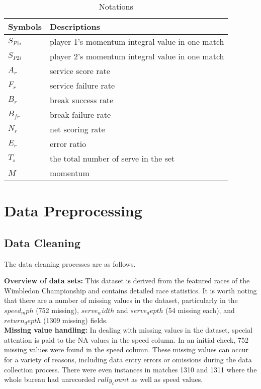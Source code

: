 \documentclass{mcmthesis}
\begin{document}
\begin{table}[h] 
\centering  
\caption{Notations}  
\label{tab1} 
\begin{tabular}{ll} 
\toprule
Symbols  & Descriptions \\    
\midrule 
$S_{P1i}$ & player 1’s momentum integral value in one match\\
$S_{P2i}$ & player 2’s momentum integral value in one match\\
$A_r$   & service score rate                             \\
$F_r$   & service failure rate                           \\
$B_r$   & break success rate                             \\
$B_{fr}$  & break failure rate                             \\
\midrule 
$N_r$   & net scoring rate                               \\
\midrule 
$E_r$   & error ratio                                    \\
\midrule 
$T_s$   & the total number of serve in the set           \\
\midrule 
$M$     & momentum                                       \\

\bottomrule
\end{tabular}
\end{table}


\section{Data Preprocessing}
\subsection{Data Cleaning}

    The data cleaning processes are as follows.

    {\bf Overview of data sets: }This dataset is derived from the featured races of the Wimbledon
Championship and contains detailed race statistics. It is worth noting that there are a number of
missing values in the dataset, particularly in the $speed_mph$ (752 missing), $serve_width$ and
$serve_depth$ (54 missing each), and $return_depth$ (1309 missing) fields. \\

    {\bf Missing value handling:} In dealing with missing values in the dataset, special attention is
paid to the NA values in the speed column. In an initial check, 752 missing values were found in
the speed column. These missing values can occur for a variety of reasons, including data entry
errors or omissions during the data collection process. There were even instances in matches 1310
and 1311 where the whole bureau had unrecorded $rally_count$ as well as speed values.
\end{document}
